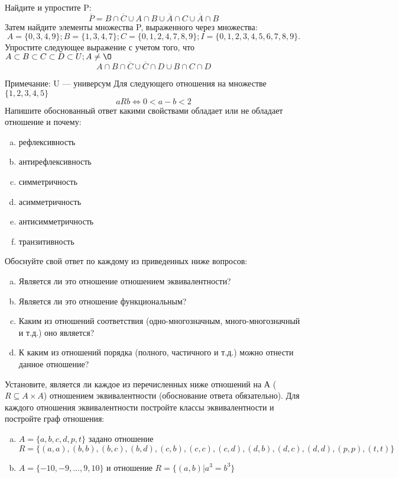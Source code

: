 \documentclass[10pt]{exam}
\begin{document}
\begin{questions}
\question
Найдите и упростите P:
\begin{equation*}
\overline{P} = B \cap \overline{C} \cup A \cap B \cup \overline{A} \cap C \cup \overline{A} \cap B
\end{equation*}
Затем найдите элементы множества P, выраженного через множества:
\begin{equation*}
A = \{0, 3, 4, 9\}; 
B = \{1, 3, 4, 7\};
C = \{0, 1, 2, 4, 7, 8, 9\};
I = \{0, 1, 2, 3, 4, 5, 6, 7, 8, 9\}.
\end{equation*}\question
Упростите следующее выражение с учетом того, что $A\subset B \subset C \subset D \subset U; A \neq \O$
\begin{equation*}
A \cap B  \cap \overline{C} \cup \overline{C} \cap D \cup B \cap C \cap D
\end{equation*}

Примечание: U — универсум\question
Для следующего отношения на множестве $\{1, 2, 3, 4, 5\}$ 
\begin{equation*}
aRb \iff 0 < a-b<2
\end{equation*}
Напишите обоснованный ответ какими свойствами обладает или не обладает отношение и почему:   
\begin{enumerate} [a)]\setcounter{enumi}{0}
\item рефлексивность
\item антирефлексивность
\item симметричность
\item асимметричность
\item антисимметричность
\item транзитивность
\end{enumerate}

Обоснуйте свой ответ по каждому из приведенных ниже вопросов:
\begin{enumerate} [a)]\setcounter{enumi}{0}
    \item Является ли это отношение отношением эквивалентности?
    \item Является ли это отношение функциональным?
    \item Каким из отношений соответствия (одно-многозначным, много-многозначный и т.д.) оно является?
    \item К каким из отношений порядка (полного, частичного и т.д.) можно отнести данное отношение?
\end{enumerate}
\question
Установите, является ли каждое из перечисленных ниже отношений на А ($R \subseteq A \times A$) отношением эквивалентности (обоснование ответа обязательно). Для каждого отношения эквивалентности постройте классы 
эквивалентности и постройте граф отношения:
\begin{enumerate} [a)]\setcounter{enumi}{0}
\item $A = \{a, b, c, d, p, t\}$ задано отношение $R = \{(a, a), (b, b), (b, c), (b, d), (c, b), (c, c), (c, d), (d, b), (d, c), (d, d), (p,p), (t,t)\}$
\item $A = \{-10, -9, … , 9, 10\}$ и отношение $R = \{(a,b)|a^{3} = b^{3}\}$


\end{enumerate}
\end{questions}
\end{document}
